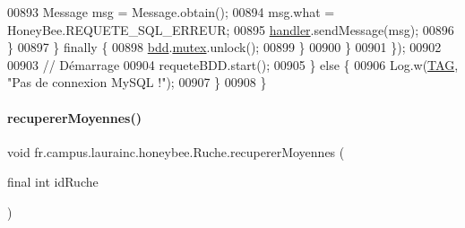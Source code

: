 \begin{DoxyCode}
00893                             Message msg = Message.obtain();
00894                             msg.what = HoneyBee.REQUETE\_SQL\_ERREUR;
00895                             \hyperlink{classfr_1_1campus_1_1laurainc_1_1honeybee_1_1_ruche_a9689ca454694434549e5fffca876ffae}{handler}.sendMessage(msg);
00896                         \}
00897                     \} \textcolor{keywordflow}{finally} \{
00898                         \hyperlink{classfr_1_1campus_1_1laurainc_1_1honeybee_1_1_ruche_a0eb43a2b63fb83e9d5af6cd6b754c7da}{bdd}.\hyperlink{classfr_1_1campus_1_1laurainc_1_1honeybee_1_1_base_de_donnees_a0dd6f285a11459c086adea6080bed282}{mutex}.unlock();
00899                     \}
00900                 \}
00901             \});
00902 
00903             \textcolor{comment}{// Démarrage}
00904             requeteBDD.start();
00905         \} \textcolor{keywordflow}{else} \{
00906             Log.w(\hyperlink{classfr_1_1campus_1_1laurainc_1_1honeybee_1_1_ruche_a44739cbb0fa7451c1edc240a3f51c257}{TAG}, \textcolor{stringliteral}{"Pas de connexion MySQL !"});
00907         \}
00908     \}
\end{DoxyCode}
\mbox{\label{classfr_1_1campus_1_1laurainc_1_1honeybee_1_1_ruche_a94f815b44f0d5d8682833d6b6e783713}} 
\paragraph{\texorpdfstring{recuperer\+Moyennes()}{recupererMoyennes()}}
{\footnotesize\ttfamily void fr.\+campus.\+laurainc.\+honeybee.\+Ruche.\+recuperer\+Moyennes (\begin{DoxyParamCaption}\item[{final int}]{id\+Ruche }\end{DoxyParamCaption})}




